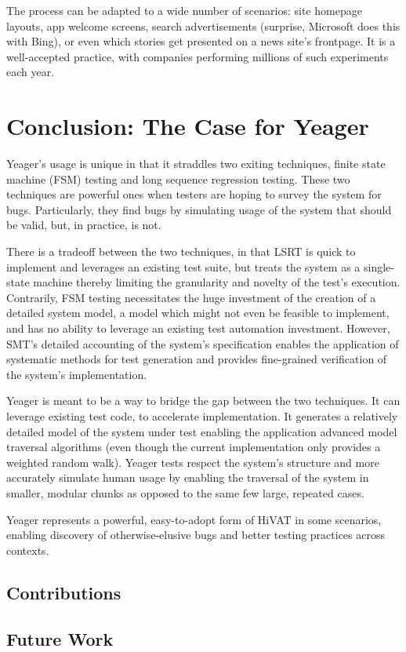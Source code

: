 The process can be adapted to a wide number of scenarios: site homepage layouts, app welcome screens, search advertisements (surprise, Microsoft does this with Bing), or even which stories get presented on a news site's frontpage. It is a well-accepted practice, with companies performing millions of such experiments each year. \citep{HBR2017ABTest}

\chapter{Conclusion: The Case for Yeager}
Yeager's usage is unique in that it straddles two exiting techniques, finite state machine (FSM) testing and long sequence regression testing. These two techniques are powerful ones when testers are hoping to survey the system for bugs. Particularly, they find bugs by simulating usage of the system that should be valid, but, in practice, is not.

There is a tradeoff between the two techniques, in that LSRT is quick to implement and leverages an existing test suite, but treats the system as a single-state machine thereby limiting the granularity and novelty of the test's execution. Contrarily, FSM testing necessitates the huge investment of the creation of a detailed system model, a model which might not even be feasible to implement, and has no ability to leverage an existing test automation investment. However, SMT's detailed accounting of the system's specification enables the application of systematic methods for test generation and provides fine-grained verification of the system's implementation.

Yeager is meant to be a way to bridge the gap between the two techniques. It can leverage existing test code, to accelerate implementation. It generates a relatively detailed model of the system under test enabling the application advanced model traversal algorithms (even though the current implementation only provides a weighted random walk). Yeager tests respect the system's structure and more accurately simulate human usage by enabling the traversal of the system in smaller, modular chunks as opposed to the same few large, repeated cases.

Yeager represents a powerful, easy-to-adopt form of HiVAT in some scenarios, enabling discovery of otherwise-elusive bugs and better testing practices across contexts.

\section{Contributions}

\section{Future Work}
